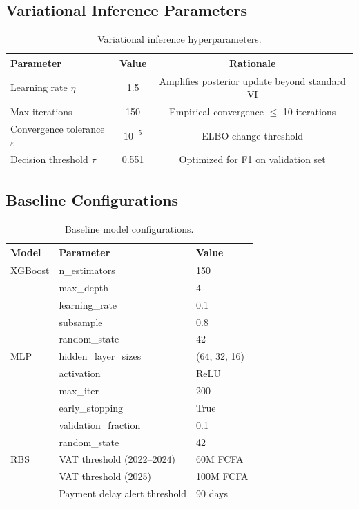 \subsection{Variational Inference Parameters}

\begin{table}[H]
\centering
\caption{Variational inference hyperparameters.}
\renewcommand{\arraystretch}{1.2}
\begin{tabular}{lcc}
\toprule
\textbf{Parameter} & \textbf{Value} & \textbf{Rationale} \\
\midrule
Learning rate $\eta$ & 1.5 & Amplifies posterior update beyond standard VI \\
Max iterations & 150 & Empirical convergence $\leq$ 10 iterations \\
Convergence tolerance $\varepsilon$ & $10^{-5}$ & ELBO change threshold \\
Decision threshold $\tau$ & 0.551 & Optimized for F1 on validation set \\
\bottomrule
\end{tabular}
\end{table}

\subsection{Baseline Configurations}

\begin{table}[H]
\centering
\caption{Baseline model configurations.}
\renewcommand{\arraystretch}{1.2}
\begin{tabular}{lll}
\toprule
\textbf{Model} & \textbf{Parameter} & \textbf{Value} \\
\midrule
XGBoost & n\_estimators & 150 \\
        & max\_depth & 4 \\
        & learning\_rate & 0.1 \\
        & subsample & 0.8 \\
        & random\_state & 42 \\[4pt]
MLP     & hidden\_layer\_sizes & (64, 32, 16) \\
        & activation & ReLU \\
        & max\_iter & 200 \\
        & early\_stopping & True \\
        & validation\_fraction & 0.1 \\
        & random\_state & 42 \\[4pt]
RBS     & VAT threshold (2022--2024) & 60M FCFA \\
        & VAT threshold (2025) & 100M FCFA \\
        & Payment delay alert threshold & 90 days \\
\bottomrule
\end{tabular}
\end{table}

